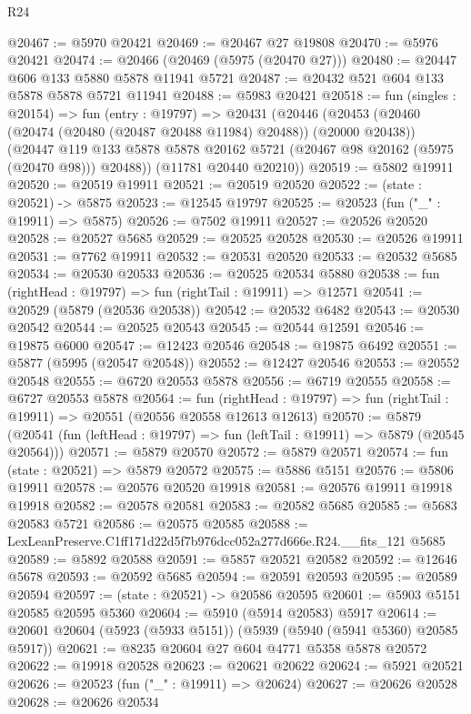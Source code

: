\begin{lexlean}{R24}
\begin{coremodule}
@20467 := @5970 @20421
@20469 := @20467 @27 @19808
@20470 := @5976 @20421
@20474 := @20466 (@20469 (@5975 (@20470 @27)))
@20480 := @20447 @606 @133 @5880 @5878 @11941 @5721
@20487 := @20432 @521 @604 @133 @5878 @5878 @5721 @11941
@20488 := @5983 @20421
@20518 := fun (singles : @20154) =>
  fun (entry : @19797) =>
  @20431
    (@20446
      (@20453
        (@20460 (@20474 (@20480 (@20487 @20488 @11984) @20488)) (@20000 @20438))
        (@20447 @119 @133 @5878 @5878 @20162 @5721 (@20467 @98 @20162 (@5975 (@20470 @98))) @20488))
      (@11781 @20440 @20210))
@20519 := @5802 @19911
@20520 := @20519 @19911
@20521 := @20519 @20520
@20522 := (state : @20521) -> @5875
@20523 := @12545 @19797
@20525 := @20523 (fun ("_" : @19911) => @5875)
@20526 := @7502 @19911
@20527 := @20526 @20520
@20528 := @20527 @5685
@20529 := @20525 @20528
@20530 := @20526 @19911
@20531 := @7762 @19911
@20532 := @20531 @20520
@20533 := @20532 @5685
@20534 := @20530 @20533
@20536 := @20525 @20534 @5880
@20538 := fun (rightHead : @19797) => fun (rightTail : @19911) => @12571
@20541 := @20529 (@5879 (@20536 @20538))
@20542 := @20532 @6482
@20543 := @20530 @20542
@20544 := @20525 @20543
@20545 := @20544 @12591
@20546 := @19875 @6000
@20547 := @12423 @20546
@20548 := @19875 @6492
@20551 := @5877 (@5995 (@20547 @20548))
@20552 := @12427 @20546
@20553 := @20552 @20548
@20555 := @6720 @20553 @5878
@20556 := @6719 @20555
@20558 := @6727 @20553 @5878
@20564 := fun (rightHead : @19797) =>
  fun (rightTail : @19911) => @20551 (@20556 @20558 @12613 @12613)
@20570 := @5879
    (@20541 (fun (leftHead : @19797) => fun (leftTail : @19911) => @5879 (@20545 @20564)))
@20571 := @5879 @20570
@20572 := @5879 @20571
@20574 := fun (state : @20521) => @5879 @20572
@20575 := @5886 @5151
@20576 := @5806 @19911
@20578 := @20576 @20520 @19918
@20581 := @20576 @19911 @19918 @19918
@20582 := @20578 @20581
@20583 := @20582 @5685
@20585 := @5683 @20583 @5721
@20586 := @20575 @20585
@20588 := LexLeanPreserve.C1ff171d22d5f7b976dcc052a277d666e.R24.__fits_121 @5685
@20589 := @5892 @20588
@20591 := @5857 @20521 @20582
@20592 := @12646 @5678
@20593 := @20592 @5685
@20594 := @20591 @20593
@20595 := @20589 @20594
@20597 := (state : @20521) -> @20586 @20595
@20601 := @5903 @5151 @20585 @20595 @5360
@20604 := @5910 (@5914 @20583) @5917
@20614 := @20601 @20604 (@5923 (@5933 @5151)) (@5939 (@5940 (@5941 @5360) @20585 @5917))
@20621 := @8235 @20604 @27 @604 @4771 @5358 @5878 @20572
@20622 := @19918 @20528
@20623 := @20621 @20622
@20624 := @5921 @20521
@20626 := @20523 (fun ("_" : @19911) => @20624)
@20627 := @20626 @20528
@20628 := @20626 @20534

\end{coremodule}
\end{lexlean}
